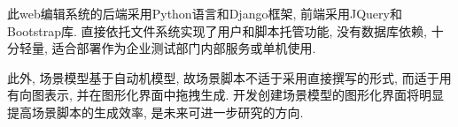             此web编辑系统的后端采用Python语言和Django框架, 前端采用JQuery和Bootstrap库. 直接依托文件系统实现了用户和脚本托管功能, 没有数据库依赖, 十分轻量, 适合部署作为企业测试部门内部服务或单机使用.
        
            \label{sec:scenario_gui_edit}
            此外, 场景模型基于自动机模型, 故场景脚本不适于采用直接撰写的形式, 而适于用有向图表示, 并在图形化界面中拖拽生成\cite{junyiw17}. 开发创建场景模型的图形化界面将明显提高场景脚本的生成效率, 是未来可进一步研究的方向.
            


